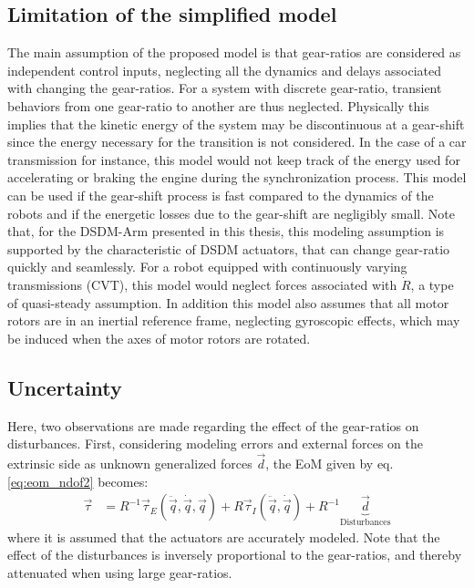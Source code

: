 \subsection{Limitation of the simplified model}
\label{sec:limitation}
%
The main assumption of the proposed model is that gear-ratios are considered as independent control inputs, neglecting all the dynamics and delays associated with changing the gear-ratios. For a system with discrete gear-ratio, transient behaviors from one gear-ratio to another are thus neglected. Physically this implies that the kinetic energy of the system may be discontinuous at a gear-shift since the energy necessary for the transition is not considered. In the case of a car transmission for instance, this model would not keep track of the energy used for accelerating or braking the engine during the synchronization process. This model can be used if the gear-shift process is fast compared to the dynamics of the robots and if the energetic losses due to the gear-shift are negligibly small. Note that, for the DSDM-Arm presented in this thesis, this modeling assumption is supported by the characteristic of DSDM actuators, that can change gear-ratio quickly and seamlessly. For a robot equipped with continuously varying transmissions (CVT), this model would neglect forces associated with $\dot{R}$, a type of quasi-steady assumption. 
%
In addition this model also assumes that all motor rotors are in an inertial reference frame, neglecting gyroscopic effects, which may be induced when the axes of motor rotors are rotated.

\subsection{Uncertainty}
\label{sec:uncertainty}

Here, two observations are made regarding the effect of the gear-ratios on disturbances. First, considering modeling errors and external forces on the extrinsic side as unknown generalized forces $\vec{d}$, the EoM given by eq. \eqref{eq:eom_ndof2} becomes:
\begin{align}
	\vec{\tau} &= R^{-1} 
	\vec{\tau}_{E}(\ddot{\vec{q}},\dot{\vec{q}},\vec{q}) 
	+ R 
	\vec{\tau}_{I}(\ddot{\vec{q}},\dot{\vec{q}})
    + R^{-1}
    \underbrace{ 
	\vec{d}
	}_{\text{Disturbances}}    
 \label{eq:eom_ndof3}
\end{align}
where it is assumed that the actuators are accurately modeled. Note that the effect of the disturbances is inversely proportional to the gear-ratios, and thereby attenuated when using large gear-ratios. 

